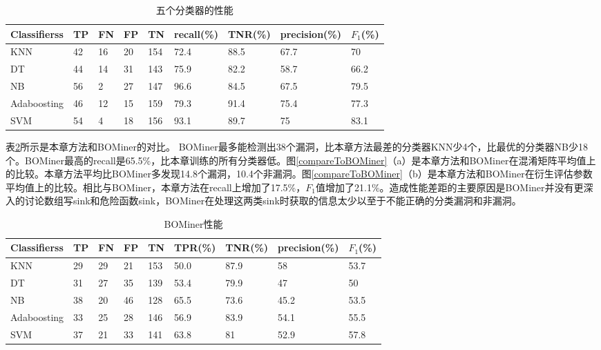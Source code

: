 {\begin{table}[ht]
\begin{center}
\caption{五个分类器的性能} \label{PERFORMANCES_OF_OUR_FIVE_CLASSIFIER_ALGORITHMS}
\begin{small}
\begin{tabular}{lllllllll}
\hline
 {\bf Classifierss}& {\bf TP} & {\bf FN} & {\bf FP} & {\bf TN} & {\bf recall(\%)} & {\bf TNR(\%)} & {\bf precision(\%)} & {\bf $F_1$(\%)}\\ \hline
KNN & 42 & 16 & 20 & 154 & 72.4 & 88.5 & 67.7 & 70\\ \hline
DT & 44 & 14 & 31 & 143 & 75.9 & 82.2 & 58.7 & 66.2\\ \hline
NB & 56 & 2 & 27 & 147 & 96.6 & 84.5 & 67.5 & 79.5\\ \hline
Adaboosting & 46 & 12 & 15 & 159 & 79.3 & 91.4 & 75.4 & 77.3\\ \hline
SVM & 54 & 4 & 18 & 156 & 93.1 & 89.7 & 75 & 83.1\\ \hline
\end{tabular}
\end{small}
\end{center}
\end{table}

表\ref{PERFORMANCE_OF_BOMINER_FOR_OUR_TEST_SUITE}所示是本章方法和BOMiner的对比。
BOMiner最多能检测出38个漏洞，比本章方法最差的分类器KNN少4个，比最优的分类器NB少18个。BOMiner最高的recall是65.5\%，比本章训练的所有分类器低。图\ref{compareToBOMiner}（a）是本章方法和BOMiner在混淆矩阵平均值上的比较。本章方法平均比BOMiner多发现14.8个漏洞，10.4个非漏洞。图\ref{compareToBOMiner}（b）是本章方法和BOMiner在衍生评估参数平均值上的比较。相比与BOMiner，本章方法在recall上增加了17.5\%，$F_1$值增加了21.1\%。造成性能差距的主要原因是BOMiner并没有更深入的讨论数组写sink和危险函数sink，BOMiner在处理这两类sink时获取的信息太少以至于不能正确的分类漏洞和非漏洞。

\begin{table}[ht]
\begin{center}
\caption{BOMiner性能} \label{PERFORMANCE_OF_BOMINER_FOR_OUR_TEST_SUITE}
\begin{small}
\begin{tabular}{lllllllll}
\hline
 {\bf Classifierss}& {\bf TP} & {\bf FN} & {\bf FP} & {\bf TN} & {\bf TPR(\%)} & {\bf TNR(\%)} & {\bf precision(\%)} & {\bf $F_1$(\%)}\\ \hline
KNN & 29 & 29 & 21 & 153 & 50.0 & 87.9 & 58 & 53.7\\ \hline
DT & 31 & 27 & 35 & 139 & 53.4 & 79.9 & 47 & 50\\ \hline
NB & 38 & 20 & 46 & 128 & 65.5 & 73.6 & 45.2 & 53.5\\ \hline
Adaboosting & 33 & 25 & 28 & 146 & 56.9 & 83.9 & 54.1 & 55.5\\ \hline
SVM & 37 & 21 & 33 & 141 & 63.8 & 81 & 52.9 & 57.8\\ \hline
\end{tabular}
\end{small}
\end{center}
\end{table}

}
